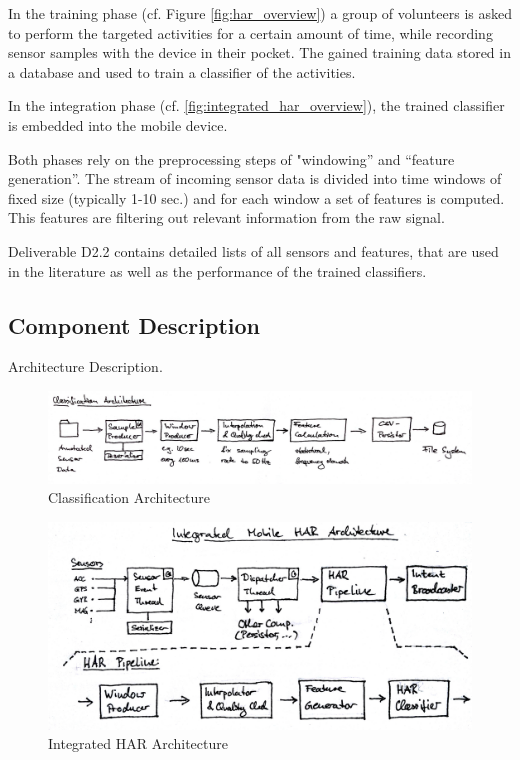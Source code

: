 In the training phase (cf. Figure \ref{fig:har_overview}) a group of
volunteers is asked to perform the targeted activities for a certain
amount of time, while recording sensor samples with the device in
their pocket.  The gained training data stored in a database and used
to train a classifier of the activities.

In the integration phase (cf. \ref{fig:integrated_har_overview}), the
trained classifier is embedded into the mobile device.

Both phases rely on the preprocessing steps of "windowing'' and
``feature generation''. The stream of incoming sensor data is divided into
time windows of fixed size (typically 1-10 sec.) and for each window
a set of features is computed. This features are filtering out
relevant information from the raw signal. 

Deliverable D2.2 contains detailed lists of all sensors and features,
that are used in the literature as well as the performance of the
trained classifiers.

\subsection{Component Description}

Architecture Description.

\begin{figure}[htbp]
\centering
\includegraphics[width=\textwidth]{img/har/classification_architecture.jpg}
\caption{Classification Architecture}\label{fig:classification_architecture}
\end{figure}

\begin{figure}[htbp]
\centering
\includegraphics[width=\textwidth]{img/har/integration.jpg}
\caption{Integrated HAR Architecture}\label{fig:integrated_har}
\end{figure}

